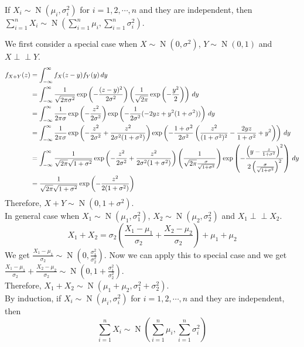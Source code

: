 \documentclass{huhtakm-template-book}
\newcommand{\independent}{\perp\!\!\!\perp}
\DeclareMathOperator{\N}{N}
\begin{document}
\begin{thm}
	If $X_{i}\sim\N(\mu_{i},\sigma_{i}^{2})$ for $i=1,2,\cdots,n$ and they are independent, then $\sum_{i=1}^{n}X_{i}\sim\N\left(\sum_{i=1}^{n}\mu_{i},\sum_{i=1}^{n}\sigma_{i}^{2}\right)$.
\end{thm}
\begin{proofing}
	We first consider a special case when $X\sim\N(0,\sigma^{2})$, $Y\sim\N(0,1)$ and $X\independent Y$.
	\begin{align*}
		f_{X+Y}(z)&=\int_{-\infty}^{\infty} f_{X}(z-y)f_{Y}(y)\,dy\\
		&=\int_{-\infty}^{\infty}\frac{1}{\sqrt{2\pi\sigma^{2}}}\exp\left(-\frac{(z-y)^{2}}{2\sigma^{2}}\right)\left(\frac{1}{\sqrt{2\pi}}\exp\left(-\frac{y^{2}}{2}\right)\right)\,dy\\
		&=\int_{-\infty}^{\infty}\frac{1}{2\pi\sigma}\exp\left(-\frac{z^{2}}{2\sigma^{2}}\right)\exp\left(-\frac{1}{2\sigma^{2}}(-2yz+y^{2}(1+\sigma^{2}))\right)\,dy\\
		&=\int_{-\infty}^{\infty}\frac{1}{2\pi\sigma}\exp\left(-\frac{z^{2}}{2\sigma^{2}}+\frac{z^{2}}{2\sigma^{2}(1+\sigma^{2})}\right)\exp\left(-\frac{1+\sigma^{2}}{2\sigma^{2}}\left(\frac{z^{2}}{(1+\sigma^{2})^{2}}-\frac{2yz}{1+\sigma^{2}}+y^{2}\right)\right)\,dy\\
		&=\int_{-\infty}^{\infty}\frac{1}{\sqrt{2\pi}\sqrt{1+\sigma^{2}}}\exp\left(-\frac{z^{2}}{2\sigma^{2}}+\frac{z^{2}}{2\sigma^{2}(1+\sigma^{2})}\right)\left(\frac{1}{\sqrt{2\pi}\frac{\sigma}{\sqrt{1+\sigma^{2}}}}\right)\exp\left(-\frac{\left(y-\frac{z}{1+\sigma^{2}}\right)^{2}}{2\left(\frac{\sigma}{\sqrt{1+\sigma^{2}}}\right)^{2}}\right)\,dy\\
		&=\frac{1}{\sqrt{2\pi}\sqrt{1+\sigma^{2}}}\exp\left(-\frac{z^{2}}{2(1+\sigma^{2})}\right)
	\end{align*}
	Therefore, $X+Y\sim\N(0,1+\sigma^{2})$.\\
	In general case when $X_{1}\sim\N(\mu_{1},\sigma_{1}^{2})$, $X_{2}\sim\N(\mu_{2},\sigma_{2}^{2})$ and $X_{1}\independent X_{2}$.
	\begin{equation*}
		X_{1}+X_{2}=\sigma_{2}\left(\frac{X_{1}-\mu_{1}}{\sigma_{2}}+\frac{X_{2}-\mu_{2}}{\sigma_{2}}\right)+\mu_{1}+\mu_{2}
	\end{equation*}
	We get $\frac{X_{1}-\mu_{1}}{\sigma_{2}}\sim\N\left(0,\frac{\sigma_{1}^{2}}{\sigma_{2}^{2}}\right)$. Now we can apply this to special case and we get $\frac{X_{1}-\mu_{1}}{\sigma_{2}}+\frac{X_{2}-\mu_{2}}{\sigma_{2}}\sim\N\left(0,1+\frac{\sigma_{1}^{2}}{\sigma_{2}^{2}}\right)$.\\
	Therefore, $X_{1}+X_{2}\sim\N(\mu_{1}+\mu_{2},\sigma_{1}^{2}+\sigma_{2}^{2})$.\\
	By induction, if $X_{i}\sim\N(\mu_{i},\sigma_{i}^{2})$ for $i=1,2,\cdots,n$ and they are independent, then
	\begin{equation*}
		\sum_{i=1}^{n}X_{i}\sim\N\left(\sum_{i=1}^{n}\mu_{i},\sum_{i=1}^{n}\sigma_{i}^{2}\right)
	\end{equation*}
\end{proofing}
\end{document}
